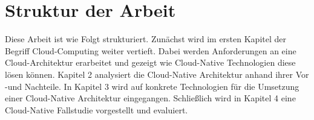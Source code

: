 \section{Struktur der Arbeit}
Diese Arbeit ist wie Folgt strukturiert. Zunächst wird im ersten Kapitel der Begriff Cloud-Computing weiter vertieft. Dabei werden Anforderungen an eine Cloud-Architektur erarbeitet und gezeigt wie Cloud-Native Technologien diese lösen können. Kapitel 2 analysiert die Cloud-Native Architektur anhand ihrer Vor -und Nachteile. In Kapitel 3 wird auf konkrete Technologien für die Umsetzung einer Cloud-Native Architektur eingegangen. Schließlich wird in Kapitel 4 eine Cloud-Native Fallstudie vorgestellt und evaluiert.  

